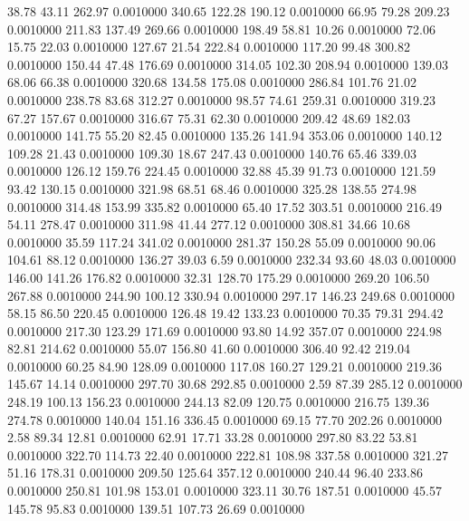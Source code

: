   38.78   43.11  262.97   0.0010000
 340.65  122.28  190.12   0.0010000
  66.95   79.28  209.23   0.0010000
 211.83  137.49  269.66   0.0010000
 198.49   58.81   10.26   0.0010000
  72.06   15.75   22.03   0.0010000
 127.67   21.54  222.84   0.0010000
 117.20   99.48  300.82   0.0010000
 150.44   47.48  176.69   0.0010000
 314.05  102.30  208.94   0.0010000
 139.03   68.06   66.38   0.0010000
 320.68  134.58  175.08   0.0010000
 286.84  101.76   21.02   0.0010000
 238.78   83.68  312.27   0.0010000
  98.57   74.61  259.31   0.0010000
 319.23   67.27  157.67   0.0010000
 316.67   75.31   62.30   0.0010000
 209.42   48.69  182.03   0.0010000
 141.75   55.20   82.45   0.0010000
 135.26  141.94  353.06   0.0010000
 140.12  109.28   21.43   0.0010000
 109.30   18.67  247.43   0.0010000
 140.76   65.46  339.03   0.0010000
 126.12  159.76  224.45   0.0010000
  32.88   45.39   91.73   0.0010000
 121.59   93.42  130.15   0.0010000
 321.98   68.51   68.46   0.0010000
 325.28  138.55  274.98   0.0010000
 314.48  153.99  335.82   0.0010000
  65.40   17.52  303.51   0.0010000
 216.49   54.11  278.47   0.0010000
 311.98   41.44  277.12   0.0010000
 308.81   34.66   10.68   0.0010000
  35.59  117.24  341.02   0.0010000
 281.37  150.28   55.09   0.0010000
  90.06  104.61   88.12   0.0010000
 136.27   39.03    6.59   0.0010000
 232.34   93.60   48.03   0.0010000
 146.00  141.26  176.82   0.0010000
  32.31  128.70  175.29   0.0010000
 269.20  106.50  267.88   0.0010000
 244.90  100.12  330.94   0.0010000
 297.17  146.23  249.68   0.0010000
  58.15   86.50  220.45   0.0010000
 126.48   19.42  133.23   0.0010000
  70.35   79.31  294.42   0.0010000
 217.30  123.29  171.69   0.0010000
  93.80   14.92  357.07   0.0010000
 224.98   82.81  214.62   0.0010000
  55.07  156.80   41.60   0.0010000
 306.40   92.42  219.04   0.0010000
  60.25   84.90  128.09   0.0010000
 117.08  160.27  129.21   0.0010000
 219.36  145.67   14.14   0.0010000
 297.70   30.68  292.85   0.0010000
   2.59   87.39  285.12   0.0010000
 248.19  100.13  156.23   0.0010000
 244.13   82.09  120.75   0.0010000
 216.75  139.36  274.78   0.0010000
 140.04  151.16  336.45   0.0010000
  69.15   77.70  202.26   0.0010000
   2.58   89.34   12.81   0.0010000
  62.91   17.71   33.28   0.0010000
 297.80   83.22   53.81   0.0010000
 322.70  114.73   22.40   0.0010000
 222.81  108.98  337.58   0.0010000
 321.27   51.16  178.31   0.0010000
 209.50  125.64  357.12   0.0010000
 240.44   96.40  233.86   0.0010000
 250.81  101.98  153.01   0.0010000
 323.11   30.76  187.51   0.0010000
  45.57  145.78   95.83   0.0010000
 139.51  107.73   26.69   0.0010000
